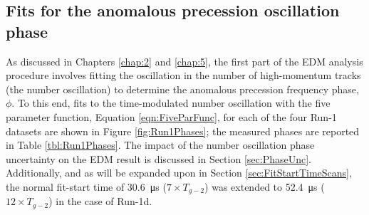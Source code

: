 \clearpage

\subsection{Fits for the anomalous precession oscillation phase}

As discussed in Chapters \ref{chap:2} and \ref{chap:5}, the first part of the EDM analysis procedure involves fitting the oscillation in the number of high-momentum tracks (the number oscillation) to determine the anomalous precession frequency phase, $\phi$. To this end, fits to the time-modulated number oscillation with the five parameter function, Equation \ref{eqn:FiveParFunc}, for each of the four Run-1 datasets are shown in Figure \ref{fig:Run1Phases}; the measured phases are reported in Table \ref{tbl:Run1Phases}. The impact of the number oscillation phase uncertainty on the EDM result is discussed in Section \ref{sec:PhaseUnc}. Additionally, and as will be expanded upon in Section \ref{sec:FitStartTimeScans}, the normal fit-start time of \SI{30.6}{\micro\second} ($7\times T_{g-2}$) was extended to \SI{52.4}{\micro\second} ($12\times T_{g-2}$) in the case of Run-1d. 


